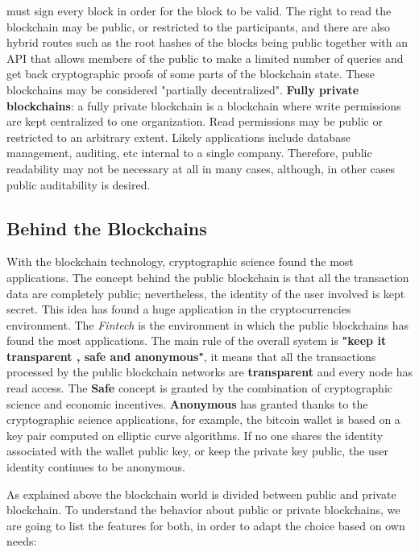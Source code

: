 \begin{outline}
    must sign every block in order for the block to be valid. The right to read the blockchain may be public, 
    or restricted to the participants, and there are also hybrid routes such as the root hashes of the blocks 
    being public together with an API that allows members of the public to make a limited number of queries 
    and get back cryptographic proofs of some parts of the blockchain state. These blockchains may be 
    considered "partially decentralized".
    \1 \textbf{Fully private blockchains}: a fully private blockchain is a blockchain where write permissions 
    are kept centralized to one organization. Read permissions may be public or restricted to an arbitrary 
    extent. Likely applications include database management, auditing, etc internal to a single company. Therefore, 
    public readability may not be necessary at all in many cases, although, in other cases public auditability 
    is desired.
\end{outline}

\subsection{Behind the Blockchains}
With the blockchain technology, cryptographic science found the most applications. The concept behind 
the public blockchain is that all the transaction data are completely public; nevertheless, the identity of the 
user involved is kept secret. This idea has found a huge application in the cryptocurrencies environment. 
The \textit{Fintech} is the environment in which the public blockchains has found the most applications. 
The main rule of the overall system is 
\textbf{"keep it transparent , safe and anonymous"}, it means that all the transactions processed by the 
public blockchain networks are \textbf{transparent } and every node has read access. The \textbf{Safe}
concept is granted by the combination of cryptographic science and economic incentives. \textbf{Anonymous}
has granted thanks to the cryptographic science applications, for example, the bitcoin wallet is based on a key pair 
computed on elliptic curve algorithms. If no one shares the identity associated with the wallet public key, or keep 
the private key public, the user identity continues to be anonymous. 
\bigskip


\bigskip
As explained above the blockchain world is divided between public and private blockchain.  
To understand the behavior about public or private blockchains, we are going to list the features
for both, in order to adapt the choice based on own needs: 

